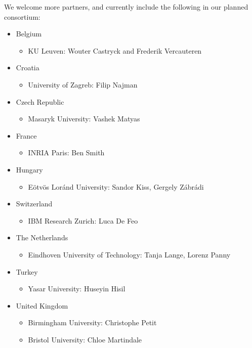 \documentclass{article}
\begin{document}
We welcome more partners, and currently include the following in our planned consortium:
\begin{itemize}
	\item Belgium
		\begin{itemize}
			\item KU Leuven: Wouter Castryck and Frederik Vercauteren
		\end{itemize}
	\item Croatia
		\begin{itemize}
			\item University of Zagreb: Filip Najman
		\end{itemize}
	\item Czech Republic
		\begin{itemize}
			\item Masaryk University: Vashek Matyas
		\end{itemize}
	\item France
		\begin{itemize}
			\item INRIA Paris: Ben Smith
		\end{itemize}
	\item Hungary
		\begin{itemize}
			\item E\"{o}tv\"{o}s Lor\'{a}nd University: Sandor Kiss,  Gergely Z\'{a}br\'{a}di
		\end{itemize}
	\item Switzerland
		\begin{itemize}
			\item IBM Research Zurich: Luca De Feo
		\end{itemize}
	\item The Netherlands
		\begin{itemize}
			\item Eindhoven University of Technology: Tanja Lange, Lorenz Panny
		\end{itemize}
	\item Turkey
		\begin{itemize}
			\item Yasar University: Huseyin Hisil
		\end{itemize}
	\item United Kingdom
		\begin{itemize}
			\item Birmingham University: Christophe Petit
			\item Bristol University: Chloe Martindale
		\end{itemize}
\end{itemize}



\end{document}
